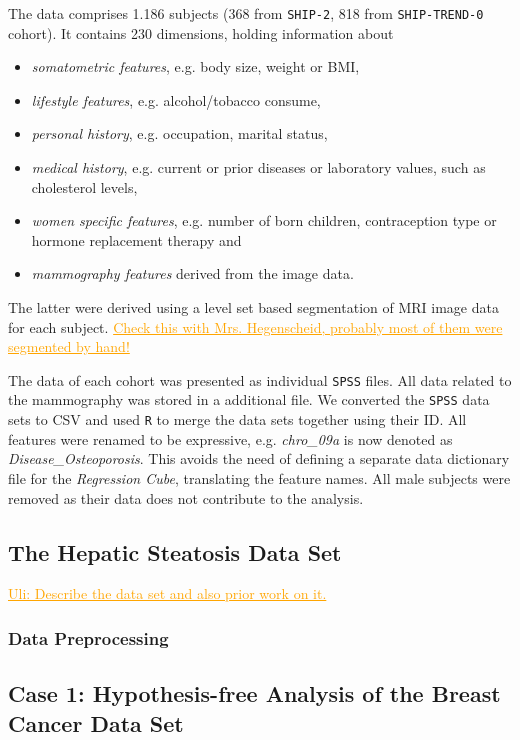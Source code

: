 \documentclass[journal]{style/vgtc} 			          %
\newcommand{\com}[1]{\textcolor{orange}{\uline{#1}}}
\begin{document}
The data comprises 1.186 subjects (368 from \texttt{SHIP-2}, 818 from \texttt{SHIP-TREND-0} cohort).
It contains 230 dimensions, holding information about
\begin{itemize}
	\item \emph{somatometric features}, e.g. body size, weight or BMI, 
	\item \emph{lifestyle features}, e.g. alcohol/tobacco consume, 
	\item \emph{personal history}, e.g. occupation, marital status,
	\item \emph{medical history}, e.g. current or prior diseases or laboratory values, such as cholesterol levels,
	\item \emph{women specific features}, e.g. number of born children, contraception type or hormone replacement therapy and
	\item \emph{mammography features} derived from the image data.
\end{itemize}
The latter were derived using a level set based segmentation \cite{Ivanovska2014} of MRI image data for each subject.
\com{Check this with Mrs. Hegenscheid, probably most of them were segmented by hand!}

The data of each cohort was presented as individual \texttt{SPSS} files.
All data related to the mammography was stored in a additional file.
We converted the \texttt{SPSS} data sets to CSV and used \texttt{R} to merge the data sets together using their ID.
All features were renamed to be expressive, e.g. \emph{chro\_09a} is now denoted as \emph{Disease\_Osteoporosis}.
This avoids the need of defining a separate data dictionary file for the \emph{Regression Cube}, translating the feature names.
All male subjects were removed as their data does not contribute to the analysis.
\subsection{The Hepatic Steatosis Data Set}
\com{Uli: Describe the data set and also prior work on it.}
\subsubsection{Data Preprocessing}
\subsection{Case 1: Hypothesis-free Analysis of the Breast Cancer Data Set}
\end{document}
